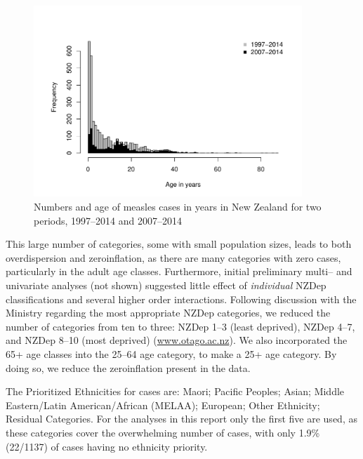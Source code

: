 \documentclass{article}
\begin{document}
\begin{figure}
     \begin{center}
     \includegraphics[width=0.9\textwidth]{case_age_dist.pdf}
     \end{center}
\caption{Numbers and age of measles cases in years in New Zealand for two periods, 1997--2014 and 2007--2014}
\label{fig:ageinyears}
\end{figure}

This large number of categories, some with small population sizes, leads to both overdispersion and zeroinflation, as there are many categories with zero cases, particularly in the adult age classes. Furthermore, initial preliminary multi-- and univariate analyses (not shown) suggested little effect of \textit{individual} NZDep classifications and several higher order interactions. Following discussion with the Ministry regarding the most appropriate NZDep categories, we reduced the number of categories from ten to three: NZDep 1--3 (least deprived), NZDep 4--7, and NZDep 8--10 (most deprived) (\href{http://www.otago.ac.nz/wellington/research/hirp/otago020194.html}{www.otago.ac.nz}). We also incorporated the 65+ age classes into the 25--64 age category, to make a 25+ age category. By doing so, we reduce the zeroinflation present in the data. 

The Prioritized Ethnicities for cases are:  Maori; Pacific Peoples; Asian; Middle Eastern/Latin American/African (MELAA); European; Other Ethnicity; Residual Categories. For the analyses in this report only the first five are used, as these categories cover the overwhelming number of cases, with only 1.9\% (22/1137) of cases having no ethnicity priority. 
\end{document}
